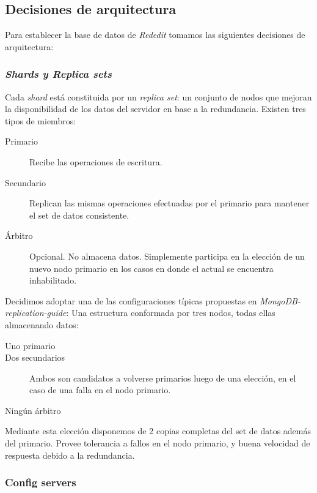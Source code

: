 \subsection{Decisiones de arquitectura}

Para establecer la base de datos de \emph{Rededit} tomamos las siguientes decisiones de arquitectura:

\subsubsection{\emph{Shards y Replica sets}}

Cada \emph{shard} está constituida por un \emph{replica set}: un conjunto de nodos que mejoran la 
disponibilidad de los datos del
servidor en base a la redundancia. Existen tres tipos de miembros:

\begin{description}
	\item[Primario] Recibe las operaciones de escritura.
	\item[Secundario] Replican las mismas operaciones efectuadas por el primario para mantener el set de datos consistente.
	\item[Árbitro] Opcional. 
	No almacena datos. Simplemente participa en la elección de un nuevo nodo primario en los casos en donde el actual se
	encuentra inhabilitado.
\end{description}

Decidimos adoptar una de las configuraciones típicas propuestas en \emph{MongoDB-replication-guide}: 
Una estructura conformada por tres nodos, todas ellas almacenando datos: 

\begin{description}
	\item[Uno primario] 
	\item[Dos secundarios] Ambos son candidatos a volverse primarios luego de una elección, en el caso de una falla
	en el nodo primario.
	\item[Ningún árbitro]
\end{description}

Mediante esta elección disponemos de 2 copias completas del set de datos además del primario. Provee tolerancia a fallos
en el nodo primario, y buena velocidad de respuesta debido a la redundancia.

\subsubsection{Config servers}

